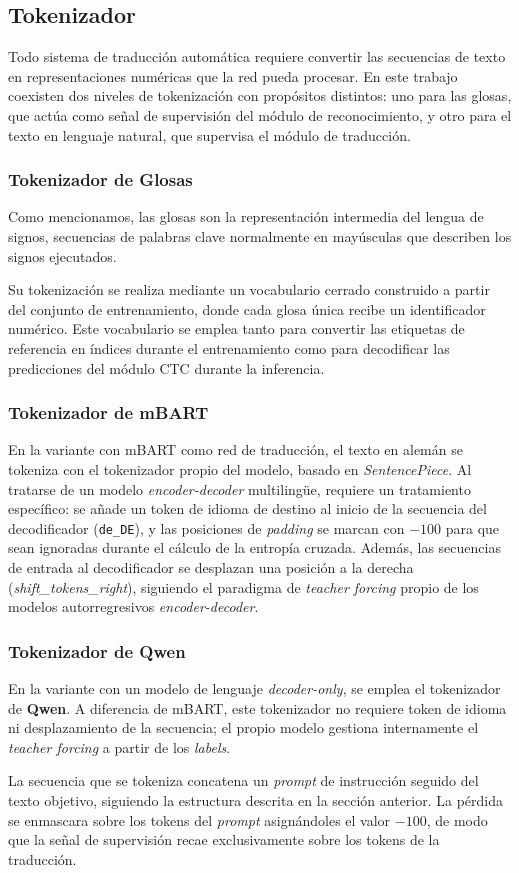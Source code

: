 \subsection{Tokenizador}
Todo sistema de traducción automática requiere convertir las secuencias de texto en representaciones numéricas que la red pueda procesar.
En este trabajo coexisten dos niveles de tokenización con propósitos distintos: uno para las glosas, que actúa como señal de supervisión del módulo de reconocimiento, y otro para el texto en lenguaje natural, que supervisa el módulo de traducción.

\subsubsection*{Tokenizador de Glosas}
Como mencionamos, las glosas son la representación intermedia del lengua de signos, secuencias de palabras clave normalmente en mayúsculas que describen los signos ejecutados.

Su tokenización se realiza mediante un vocabulario cerrado construido a partir del conjunto de entrenamiento, donde cada glosa única recibe un identificador numérico.
Este vocabulario se emplea tanto para convertir las etiquetas de referencia en índices durante el entrenamiento como para decodificar las predicciones del módulo CTC durante la inferencia.

\subsubsection*{Tokenizador de mBART}
En la variante con mBART como red de traducción, el texto en alemán se tokeniza con el tokenizador propio del modelo, basado en \textit{SentencePiece}.
Al tratarse de un modelo \textit{encoder-decoder} multilingüe, requiere un tratamiento específico: se añade un token de idioma de destino al inicio de la secuencia del decodificador (\texttt{de\_DE}), y las posiciones de \textit{padding} se marcan con $-100$ para que sean ignoradas durante el cálculo de la entropía cruzada.
Además, las secuencias de entrada al decodificador se desplazan una posición a la derecha (\textit{shift\_tokens\_right}), siguiendo el paradigma de \textit{teacher forcing} propio de los modelos autorregresivos \textit{encoder-decoder}.

\subsubsection*{Tokenizador de Qwen}
En la variante con un modelo de lenguaje \textit{decoder-only}, se emplea el tokenizador de \textbf{Qwen}.
A diferencia de mBART, este tokenizador no requiere token de idioma ni desplazamiento de la secuencia; el propio modelo gestiona internamente el \textit{teacher forcing} a partir de los \textit{labels}.

La secuencia que se tokeniza concatena un \textit{prompt} de instrucción seguido del texto objetivo, siguiendo la estructura descrita en la sección anterior.
La pérdida se enmascara sobre los tokens del \textit{prompt} asignándoles el valor $-100$, de modo que la señal de supervisión recae exclusivamente sobre los tokens de la traducción.


